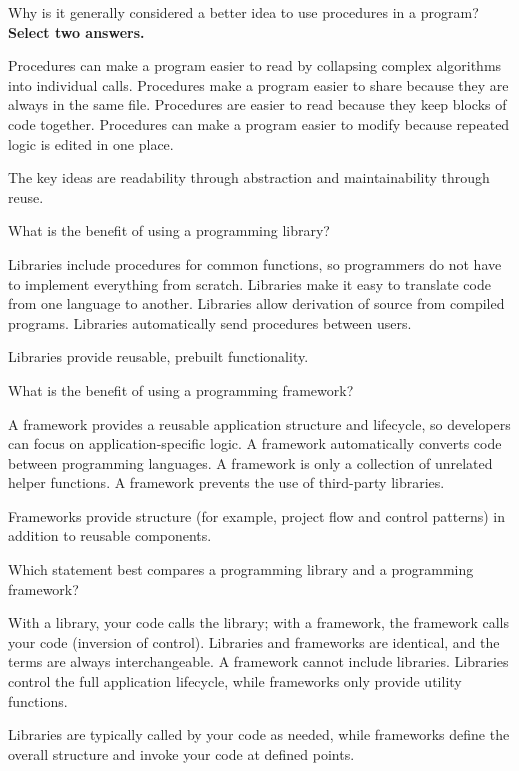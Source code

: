\question[5]
Why is it generally considered a better idea to use procedures in a program? \textbf{Select two answers.}
\begin{checkboxes}
  \CorrectChoice Procedures can make a program easier to read by collapsing complex algorithms into individual calls.
  \choice Procedures make a program easier to share because they are always in the same file.
  \choice Procedures are easier to read because they keep blocks of code together.
  \CorrectChoice Procedures can make a program easier to modify because repeated logic is edited in one place.
\end{checkboxes}
\begin{solution}
  The key ideas are readability through abstraction and maintainability through reuse.
\end{solution}

\question[5]
What is the benefit of using a programming library?
\begin{choices}
  \CorrectChoice Libraries include procedures for common functions, so programmers do not have to implement everything from scratch.
  \choice Libraries make it easy to translate code from one language to another.
  \choice Libraries allow derivation of source from compiled programs.
  \choice Libraries automatically send procedures between users.
\end{choices}
\begin{solution}
  Libraries provide reusable, prebuilt functionality.
\end{solution}

\question[5]
What is the benefit of using a programming framework?
\begin{choices}
  \CorrectChoice A framework provides a reusable application structure and lifecycle, so developers can focus on application-specific logic.
  \choice A framework automatically converts code between programming languages.
  \choice A framework is only a collection of unrelated helper functions.
  \choice A framework prevents the use of third-party libraries.
\end{choices}
\begin{solution}
  Frameworks provide structure (for example, project flow and control patterns) in addition to reusable components.
\end{solution}

\newpage 

\question[5]
Which statement best compares a programming library and a programming framework?
\begin{choices}
  \CorrectChoice With a library, your code calls the library; with a framework, the framework calls your code (inversion of control).
  \choice Libraries and frameworks are identical, and the terms are always interchangeable.
  \choice A framework cannot include libraries.
  \choice Libraries control the full application lifecycle, while frameworks only provide utility functions.
\end{choices}
\begin{solution}
  Libraries are typically called by your code as needed, while frameworks define the overall structure and invoke your code at defined points.
\end{solution}


